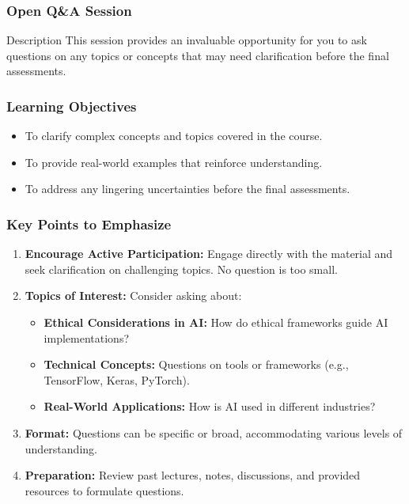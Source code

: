\documentclass[aspectratio=169]{beamer}
\begin{document}
\begin{frame}[fragile]
  \frametitle{Open Q\&A Session}
  \begin{block}{Description}
    This session provides an invaluable opportunity for you to ask questions on any topics or concepts that may need clarification before the final assessments.
  \end{block}
\end{frame}

\begin{frame}[fragile]
  \frametitle{Learning Objectives}
  \begin{itemize}
    \item To clarify complex concepts and topics covered in the course.
    \item To provide real-world examples that reinforce understanding.
    \item To address any lingering uncertainties before the final assessments.
  \end{itemize}
\end{frame}

\begin{frame}[fragile]
  \frametitle{Key Points to Emphasize}
  \begin{enumerate}
    \item \textbf{Encourage Active Participation:} 
      Engage directly with the material and seek clarification on challenging topics. No question is too small.
    
    \item \textbf{Topics of Interest:} 
      Consider asking about:
      \begin{itemize}
        \item \textbf{Ethical Considerations in AI:} How do ethical frameworks guide AI implementations?
        \item \textbf{Technical Concepts:} Questions on tools or frameworks (e.g., TensorFlow, Keras, PyTorch).
        \item \textbf{Real-World Applications:} How is AI used in different industries?
      \end{itemize}
    
    \item \textbf{Format:} Questions can be specific or broad, accommodating various levels of understanding.
    
    \item \textbf{Preparation:} Review past lectures, notes, discussions, and provided resources to formulate questions.
  \end{enumerate}
\end{frame}
\end{document}
